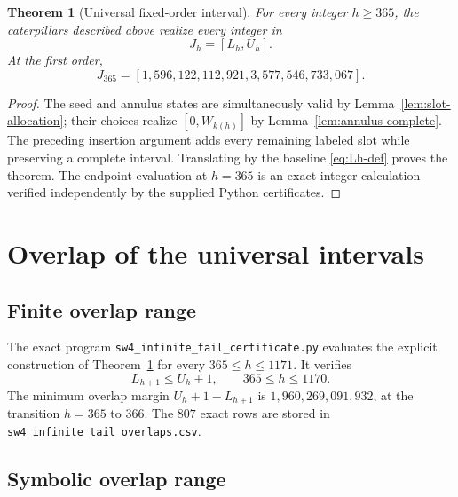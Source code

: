 \documentclass[11pt]{article}
\newtheorem{theorem}{Theorem}[section]
\theoremstyle{definition}
\theoremstyle{remark}
\newcommand{\code}[1]{\nolinkurl{#1}}
\begin{document}
\begin{theorem}[Universal fixed-order interval]\label{thm:fixed-order}
For every integer $h\ge365$, the caterpillars described above realize every
integer in
\[
  J_h=[L_h,U_h].
\]
At the first order,
\begin{equation}\label{eq:J365}
  J_{365}=
  [1{,}596{,}122{,}112{,}921,
   3{,}577{,}546{,}733{,}067].
\end{equation}
\end{theorem}

\begin{proof}
The seed and annulus states are simultaneously valid by
Lemma~\ref{lem:slot-allocation}; their choices realize $[0,W_{k(h)}]$ by
Lemma~\ref{lem:annulus-complete}.  The preceding insertion argument adds every
remaining labeled slot while preserving a complete interval.  Translating by
the baseline \eqref{eq:Lh-def} proves the theorem.  The endpoint evaluation at
$h=365$ is an exact integer calculation verified independently by the supplied
Python certificates.
\end{proof}

\section{Overlap of the universal intervals}

\subsection{Finite overlap range}

The exact program \code{sw4_infinite_tail_certificate.py} evaluates the
explicit construction of Theorem~\ref{thm:fixed-order} for every
$365\le h\le1171$.  It verifies
\begin{equation}\label{eq:finite-universal-overlap}
  L_{h+1}\le U_h+1,
  \qquad 365\le h\le1170.
\end{equation}
The minimum overlap margin $U_h+1-L_{h+1}$ is
$1{,}960{,}269{,}091{,}932$, at the transition $h=365$ to $366$.
The $807$ exact rows are stored in
\code{sw4_infinite_tail_overlaps.csv}.

\subsection{Symbolic overlap range}
\end{document}

